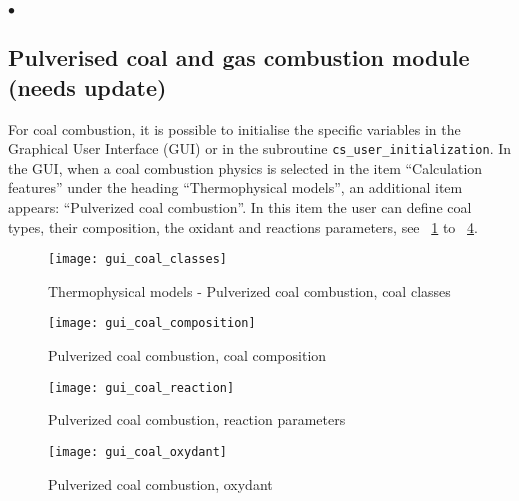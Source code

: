 {{{\begin{list}{$\bullet$}{}
\end{list}

\clearpage

\subsection[Pulverised coal and gas combustion module]
{Pulverised coal and gas combustion module (needs update)}
\label{sec:Ini-coal}
For coal combustion, it is possible to initialise the specific variables in the Graphical User Interface (GUI) or in the subroutine
\texttt{cs\_user\_initialization}. In the GUI, when a coal combustion physics is selected in the item ``Calculation features'' under the heading
``Thermophysical models'', an additional item appears: ``Pulverized coal combustion''. In this item the user can define coal types, their composition, the oxidant and reactions parameters, see \figurename~\ref{fig:Ini-coal1} to \figurename~\ref{fig:Ini-coal5}.

\begin{figure}[!ht]
\begin{center}
\texttt{[image: gui\_coal\_classes]}
\caption{Thermophysical models - Pulverized coal combustion, coal classes}
\label{fig:Ini-coal1}
\end{center}
\end{figure}

\begin{figure}[!ht]
\begin{center}
\texttt{[image: gui\_coal\_composition]}
\caption{Pulverized coal combustion, coal composition}
\label{fig:Ini-coal3}
\end{center}
\end{figure}

\begin{figure}[!ht]
\begin{center}
\texttt{[image: gui\_coal\_reaction]}
\caption{Pulverized coal combustion, reaction parameters}
\label{fig:Ini-coal4}
\end{center}
\end{figure}

\begin{figure}[!ht]
\begin{center}
\texttt{[image: gui\_coal\_oxydant]}
\caption{Pulverized coal combustion, oxydant}
\label{fig:Ini-coal5}
\end{center}
\end{figure}

}}}
